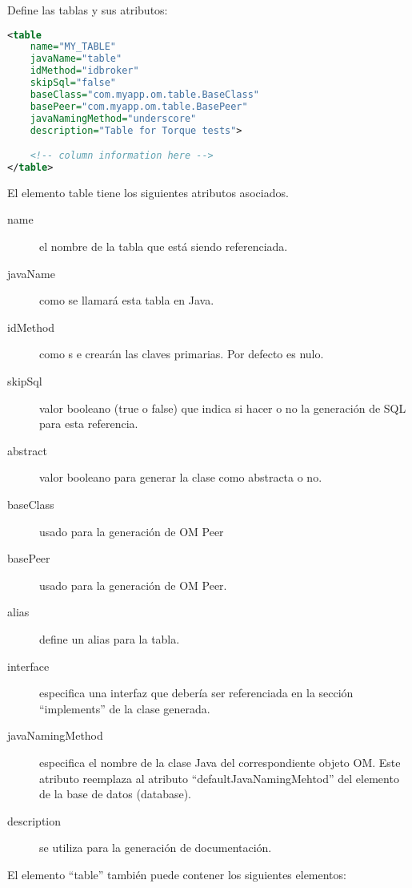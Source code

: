 Define las tablas y sus atributos:

\begin{lstlisting}[language=XML]
<table
	name="MY_TABLE"
	javaName="table"
	idMethod="idbroker"
	skipSql="false"
	baseClass="com.myapp.om.table.BaseClass"
	basePeer="com.myapp.om.table.BasePeer"
	javaNamingMethod="underscore"
	description="Table for Torque tests">

	<!-- column information here -->
</table>
\end{lstlisting}

El elemento table tiene los siguientes atributos asociados.

\begin{description}
	\item[name] el nombre de la tabla que está siendo referenciada.
	\item[javaName] como se llamará esta tabla en Java.
	\item[idMethod] como s e crearán las claves primarias. Por defecto es nulo.
	\item[skipSql] valor booleano (true o false) que indica si hacer o no la generación de SQL para esta referencia.
	\item[abstract] valor booleano para generar la clase como abstracta o no.
	\item[baseClass] usado para la generación de OM Peer
	\item[basePeer] usado para la generación de OM Peer.
	\item[alias] define un alias para la tabla.
	\item[interface] especifica una interfaz que debería ser referenciada en la sección “implements” de la clase generada.
	\item[javaNamingMethod] especifica el nombre de la clase Java del correspondiente objeto OM. Este atributo reemplaza al atributo “defaultJavaNamingMehtod” del elemento de la base de datos (database).
	\item[description] se utiliza para la generación de documentación.
\end{description}

El elemento “table” también puede contener los siguientes elementos:
